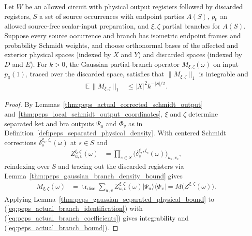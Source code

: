 \begin{lemma}
    \label{thm:peps_actual_gaussian_branch}
    \leanok
    Let $W$ be an allowed circuit with physical output registers followed by
    discarded registers, $S$ a set of source occurrences with endpoint parties
    $A(S)$, $p_0$ an allowed source-free scalar-input preparation, and
    $\xi,\zeta$ partial branches for $A(S)$. Suppose every source occurrence and
    branch has isometric endpoint frames and probability Schmidt weights, and
    choose orthonormal bases of the affected and exterior physical spaces
    (indexed by $X$ and $Y$) and discarded spaces (indexed by $D$ and $E$). For
    $k>0$, the Gaussian partial-branch operator $M_{\xi,\zeta}(\omega)$ on input
    $p_0(1)$, traced over the discarded space, satisfies that
    $\|M_{\xi,\zeta}\|_1$ is integrable and
    \begin{align}
        \mathbb E\,\|M_{\xi,\zeta}\|_1
         & \leq |X|^2 k^{-|S|/2}.
        \label{eq:peps_actual_branch_bound}
    \end{align}
\end{lemma}
\begin{proof}
    \leanok
    By Lemmas~\ref{thm:peps_actual_corrected_schmidt_output}
    and~\ref{thm:peps_local_schmidt_output_coordinates}, $\xi$ and $\zeta$
    determine separated ket and bra outputs $\Psi_u$ and $\Phi_v$ as in
    Definition~\ref{def:peps_separated_physical_density}. With centered Schmidt
    corrections $\delta_s^{\xi_s,\zeta_s}(\omega)$ at $s\in S$ and
    \begin{align}
        Z^{\xi,\zeta}_{u,v}(\omega)
         & =\prod_{s\in S}
        \bigl(\delta_s^{\xi_s,\zeta_s}(\omega)\bigr)_{u_s,v_s},
        \label{eq:peps_actual_branch_coefficients}
    \end{align}
    reindexing over $S$ and tracing out the discarded registers via
    Lemma~\ref{thm:peps_gaussian_branch_density_bound} gives
    \begin{align}
        M_{\xi,\zeta}(\omega)
         & =\operatorname{tr}_{\mathrm{disc}}
        \sum_{u,v}Z^{\xi,\zeta}_{u,v}(\omega)
        |\Psi_u\rangle\langle\Phi_v|
        =M\bigl(Z^{\xi,\zeta}(\omega)\bigr).
        \label{eq:peps_actual_branch_identification}
    \end{align}
    Applying Lemma~\ref{thm:peps_gaussian_separated_physical_bound} to
    (\ref{eq:peps_actual_branch_identification}) with
    (\ref{eq:peps_actual_branch_coefficients}) gives integrability and
    (\ref{eq:peps_actual_branch_bound}).
\end{proof}


